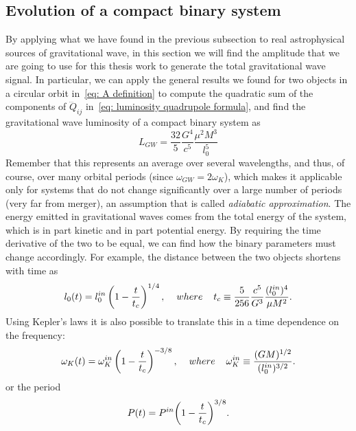 \subsection{Evolution of a compact binary system}
By applying what we have found in the previous subsection to real astrophysical sources of gravitational wave, in this section we will find the amplitude that we are going to use for this thesis work to generate the total gravitational wave signal.
In particular, we can apply the general results we found for two objects in a circular orbit in~\eqref{eq: A definition} to compute the quadratic sum of the components of $\dddot{Q}_{ij}$ in~\eqref{eq: luminosity quadrupole formula}, and find the gravitational wave luminosity of a compact binary system as
\[
    L_{GW}=\frac{32}{5}\frac{G^4}{c^5}\frac{\mu^2 M^3}{l_0^5}
\]
Remember that this represents an average over several wavelengths, and thus, of course, over many orbital periods (since $\omega_{GW}=2\omega_K$), which makes it applicable only for systems that do not change significantly over a large number of periods (very far from merger), an assumption that is called \textit{adiabatic approximation}.
The energy emitted in gravitational waves comes from the total energy of the system, which is in part kinetic and in part potential energy. 
By requiring the time derivative of the two to be equal, we can find how the binary parameters must change accordingly. 
For example, the distance between the two objects shortens with time as
\begin{equation}
    l_0(t) = l_0^{in}\left(1-\frac{t}{t_c}\right)^{1/4},\hspace{4mm} where\hspace{4mm}    t_c\equiv \frac{5}{256}\frac{c^5}{G^3}\frac{(l_0^{in})^4}{\mu M^2}.
    \label{eq: l_0 time variation}
\end{equation}
Using Kepler's laws it is also possible to translate this in a time dependence on the frequency:
\begin{equation}
    \omega_K(t) = \omega_K^{in}\left(1-\frac{t}{t_c}\right)^{-3/8}, \hspace{4mm} where\hspace{4mm}\omega_K^{in} \equiv \frac{(GM)^{1/2}}{(l_0^{in})^{3/2}}.
    \label{eq: omega_K time variation}
\end{equation}
or the period
\begin{equation}
    P(t) = P^{in}{\left(1-\frac{t}{t_c}\right)}^{3/8}.
    \notag
\end{equation}

